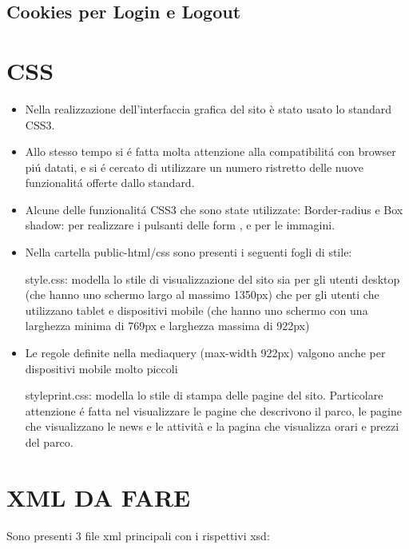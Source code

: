 \documentclass[12pt]{article}
\begin{document}
\subsection{Cookies per Login e Logout}


	
		\newpage	
	\section{CSS}
			\begin{itemize}
				\item Nella realizzazione dell'interfaccia grafica del sito è stato usato lo standard CSS3.
				\item Allo stesso tempo si \'e fatta molta attenzione alla compatibilit\'a con browser pi\'u datati, e si \'e cercato di utilizzare un numero ristretto delle nuove funzionalit\'a offerte dallo standard.
				
				\item Alcune delle funzionalit\'a CSS3 che sono state utilizzate:
				Border-radius e Box shadow: per realizzare i pulsanti delle form , e per le immagini.
				
			
				\item Nella cartella public-html/css sono presenti i seguenti fogli di stile:

				\subitem style.css: modella lo stile di visualizzazione del sito sia per gli utenti desktop (che hanno uno schermo largo al massimo 1350px) che per gli utenti che utilizzano tablet e dispositivi mobile (che hanno uno schermo con una larghezza minima di 769px e larghezza massima di 922px) 

				\item Le regole definite nella mediaquery (max-width 922px) valgono anche per dispositivi mobile molto piccoli

				\subitem styleprint.css: modella lo stile di stampa delle pagine del sito. Particolare attenzione \'e fatta nel visualizzare le pagine che descrivono il parco, le pagine che visualizzano le news e le attività e la pagina che visualizza orari e prezzi del parco.

\end{itemize}
					\newpage
				
		\section{XML DA FARE}
		Sono presenti 3 file xml principali con i rispettivi xsd:
\end{document}
